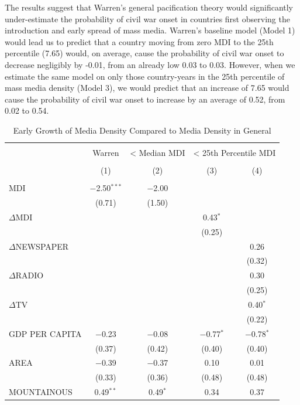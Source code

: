 \documentclass[11pt,article,oneside]{memoir}
\begin{document}
The results suggest that Warren's general pacification theory would
significantly under-estimate the probability of civil war onset in
countries first observing the introduction and early spread of mass
media. Warren's baseline model (Model 1) would lead us to predict that a
country moving from zero MDI to the 25th percentile (7.65) would, on
average, cause the probability of civil war onset to decrease negligibly
by -0.01, from an already low 0.03 to 0.03. However, when we estimate
the same model on only those country-years in the 25th percentile of
mass media density (Model 3), we would predict that an increase of 7.65
would cause the probability of civil war onset to increase by an average
of 0.52, from 0.02 to 0.54.

\begin{table}[!htbp] \centering 
  \caption{Early Growth of Media Density Compared to Media Density in General} 
  \label{} 
\scriptsize 
\begin{tabular}{@{\extracolsep{5pt}}lcccc} 
\\[-1.8ex]\hline \\[-1.8ex] 
 & Warren & < Median MDI & \multicolumn{2}{c}{< 25th Percentile MDI} \\ 
\\[-1.8ex] & (1) & (2) & (3) & (4)\\ 
\hline \\[-1.8ex] 
 MDI & $-$2.50$^{***}$ & $-$2.00 &  &  \\ 
  & (0.71) & (1.50) &  &  \\ 
  $\Delta$MDI &  &  & 0.43$^{*}$ &  \\ 
  &  &  & (0.25) &  \\ 
  $\Delta$NEWSPAPER &  &  &  & 0.26 \\ 
  &  &  &  & (0.32) \\ 
  $\Delta$RADIO &  &  &  & 0.30 \\ 
  &  &  &  & (0.25) \\ 
  $\Delta$TV &  &  &  & 0.40$^{*}$ \\ 
  &  &  &  & (0.22) \\ 
  GDP PER CAPITA & $-$0.23 & $-$0.08 & $-$0.77$^{*}$ & $-$0.78$^{*}$ \\ 
  & (0.37) & (0.42) & (0.40) & (0.40) \\ 
  AREA & $-$0.39 & $-$0.37 & 0.10 & 0.01 \\ 
  & (0.33) & (0.36) & (0.48) & (0.48) \\ 
  MOUNTAINOUS & 0.49$^{**}$ & 0.49$^{*}$ & 0.34 & 0.37 \\ 

\end{tabular}
\end{table}
\end{document}

